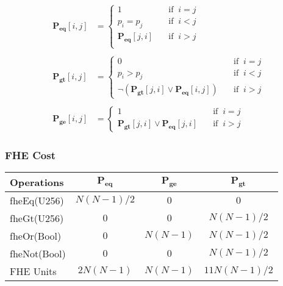\begin{equation*}
\begin{split}
    \mathbf{P_{eq}}[i, j] &= 
    \begin{cases}
        1              \quad &\text{if } \ i = j \\
        p_{i} = p_{j}  \quad &\text{if } \ i < j \\
        \mathbf{P_{eq}}[j, i] \quad &\text{if } \ i > j \\
    \end{cases}
    \\
    \\
    \mathbf{P_{gt}}[i, j] &= 
    \begin{cases}
        0              \quad &\text{if } \ i = j \\
        p_{i} > p_{j}  \quad &\text{if } \ i < j \\
        \neg(\mathbf{P_{gt}}[j, i] \lor \mathbf{P_{eq}}[i, j])  \quad &\text{if }  \ i > j
    \end{cases}
    \\
    \\
    \mathbf{P_{ge}}[i, j] &= 
    \begin{cases}
        1              \quad &\text{if } \ i = j \\
        \mathbf{P_{gt}}[j, i] \lor \mathbf{P_{eq}}[j, i] \quad &\text{if }  \ i > j
    \end{cases}
\end{split}
\end{equation*}

\subsubsection{FHE Cost}

\renewcommand{\arraystretch}{1.5}
\begin{tabular}{ |l|c|c|c| }
    \hline    
    Operations & $\mathbf{P_{eq}}$ & $\mathbf{P_{ge}}$ & $\mathbf{P_{gt}}$ \\ 
    \hline
    fheEq(U256)         & $N(N-1)/2$  & $0$      & $0$ \\
    fheGt(U256)         & $0$         & $0$      & $N(N-1)/2$ \\
    fheOr(Bool)         & $0$         & $N(N-1)$ & $N(N-1)/2$ \\
    fheNot(Bool)        & $0$         & $0$      & $N(N-1)/2$ \\
    \hline
    \hline
    FHE Units           & $2N(N-1)$   & $N(N-1)$ & $11N(N-1)/2$ \\
    \hline
\end{tabular}

